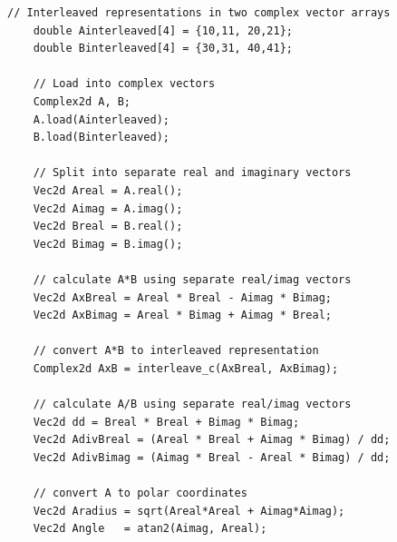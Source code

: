 \documentclass[11pt,a4paper,oneside,openright]{report}
\newcommand{\vspacebig}{\vspace{6mm}}
\begin{document}
\begin{lstlisting}[frame=none]
    // Interleaved representations in two complex vector arrays
    double Ainterleaved[4] = {10,11, 20,21};
    double Binterleaved[4] = {30,31, 40,41};

    // Load into complex vectors
    Complex2d A, B;
    A.load(Ainterleaved);
    B.load(Binterleaved);

    // Split into separate real and imaginary vectors
    Vec2d Areal = A.real();
    Vec2d Aimag = A.imag();
    Vec2d Breal = B.real();
    Vec2d Bimag = B.imag();

    // calculate A*B using separate real/imag vectors
    Vec2d AxBreal = Areal * Breal - Aimag * Bimag; 
    Vec2d AxBimag = Areal * Bimag + Aimag * Breal;

    // convert A*B to interleaved representation
    Complex2d AxB = interleave_c(AxBreal, AxBimag);

    // calculate A/B using separate real/imag vectors
    Vec2d dd = Breal * Breal + Bimag * Bimag; 
    Vec2d AdivBreal = (Areal * Breal + Aimag * Bimag) / dd;
    Vec2d AdivBimag = (Aimag * Breal - Areal * Bimag) / dd;

    // convert A to polar coordinates
    Vec2d Aradius = sqrt(Areal*Areal + Aimag*Aimag);
    Vec2d Angle   = atan2(Aimag, Areal);
\end{lstlisting}
\vspacebig
\end{document}
